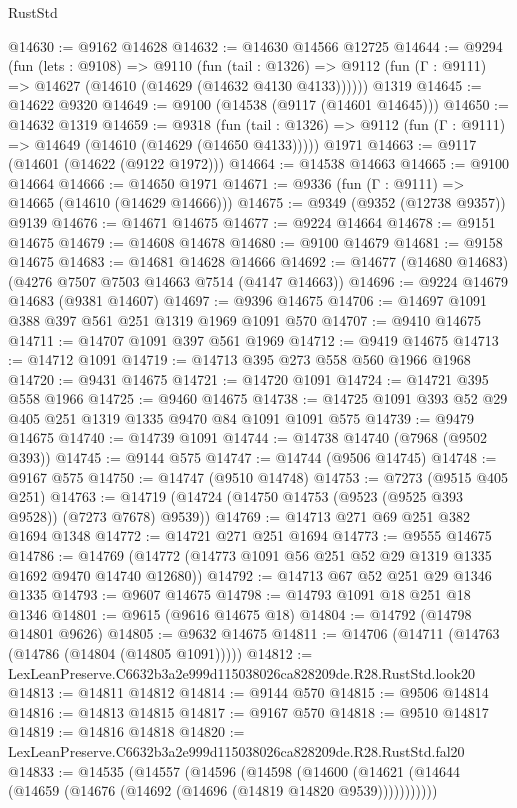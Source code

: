 \begin{lexlean}{RustStd}
\begin{coremodule}
@14630 := @9162 @14628
@14632 := @14630 @14566 @12725
@14644 := @9294
    (fun (lets : @9108) =>
    @9110
      (fun (tail : @1326) =>
      @9112 (fun (Γ : @9111) => @14627 (@14610 (@14629 (@14632 @4130 @4133))))))
    @1319
@14645 := @14622 @9320
@14649 := @9100 (@14538 (@9117 (@14601 @14645)))
@14650 := @14632 @1319
@14659 := @9318
    (fun (tail : @1326) => @9112 (fun (Γ : @9111) => @14649 (@14610 (@14629 (@14650 @4133)))))
    @1971
@14663 := @9117 (@14601 (@14622 (@9122 @1972)))
@14664 := @14538 @14663
@14665 := @9100 @14664
@14666 := @14650 @1971
@14671 := @9336 (fun (Γ : @9111) => @14665 (@14610 (@14629 @14666)))
@14675 := @9349 (@9352 (@12738 @9357)) @9139
@14676 := @14671 @14675
@14677 := @9224 @14664
@14678 := @9151 @14675
@14679 := @14608 @14678
@14680 := @9100 @14679
@14681 := @9158 @14675
@14683 := @14681 @14628 @14666
@14692 := @14677 (@14680 @14683) (@4276 @7507 @7503 @14663 @7514 (@4147 @14663))
@14696 := @9224 @14679 @14683 (@9381 @14607)
@14697 := @9396 @14675
@14706 := @14697 @1091 @388 @397 @561 @251 @1319 @1969 @1091 @570
@14707 := @9410 @14675
@14711 := @14707 @1091 @397 @561 @1969
@14712 := @9419 @14675
@14713 := @14712 @1091
@14719 := @14713 @395 @273 @558 @560 @1966 @1968
@14720 := @9431 @14675
@14721 := @14720 @1091
@14724 := @14721 @395 @558 @1966
@14725 := @9460 @14675
@14738 := @14725 @1091 @393 @52 @29 @405 @251 @1319 @1335 @9470 @84 @1091 @1091 @575
@14739 := @9479 @14675
@14740 := @14739 @1091
@14744 := @14738 @14740 (@7968 (@9502 @393))
@14745 := @9144 @575
@14747 := @14744 (@9506 @14745)
@14748 := @9167 @575
@14750 := @14747 (@9510 @14748)
@14753 := @7273 (@9515 @405 @251)
@14763 := @14719 (@14724 (@14750 @14753 (@9523 (@9525 @393 @9528)) (@7273 @7678) @9539))
@14769 := @14713 @271 @69 @251 @382 @1694 @1348
@14772 := @14721 @271 @251 @1694
@14773 := @9555 @14675
@14786 := @14769 (@14772 (@14773 @1091 @56 @251 @52 @29 @1319 @1335 @1692 @9470 @14740 @12680))
@14792 := @14713 @67 @52 @251 @29 @1346 @1335
@14793 := @9607 @14675
@14798 := @14793 @1091 @18 @251 @18 @1346
@14801 := @9615 (@9616 @14675 @18)
@14804 := @14792 (@14798 @14801 @9626)
@14805 := @9632 @14675
@14811 := @14706 (@14711 (@14763 (@14786 (@14804 (@14805 @1091)))))
@14812 := LexLeanPreserve.C6632b3a2e999d115038026ca828209de.R28.RustStd.look20
@14813 := @14811 @14812
@14814 := @9144 @570
@14815 := @9506 @14814
@14816 := @14813 @14815
@14817 := @9167 @570
@14818 := @9510 @14817
@14819 := @14816 @14818
@14820 := LexLeanPreserve.C6632b3a2e999d115038026ca828209de.R28.RustStd.fal20
@14833 := @14535
    (@14557
      (@14596
        (@14598
          (@14600 (@14621 (@14644 (@14659 (@14676 (@14692 (@14696 (@14819 @14820 @9539)))))))))))

\end{coremodule}
\end{lexlean}

